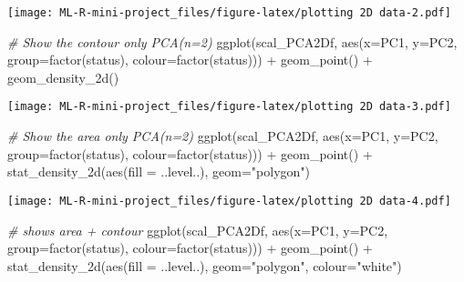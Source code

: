 \documentclass[
]{article}
\newenvironment{Shaded}{\begin{snugshade}}{\end{snugshade}}
\newcommand{\AttributeTok}[1]{\textcolor[rgb]{0.77,0.63,0.00}{#1}}
\newcommand{\CommentTok}[1]{\textcolor[rgb]{0.56,0.35,0.01}{\textit{#1}}}
\newcommand{\FunctionTok}[1]{\textcolor[rgb]{0.00,0.00,0.00}{#1}}
\newcommand{\NormalTok}[1]{#1}
\newcommand{\SpecialCharTok}[1]{\textcolor[rgb]{0.00,0.00,0.00}{#1}}
\newcommand{\StringTok}[1]{\textcolor[rgb]{0.31,0.60,0.02}{#1}}
\begin{document}
\texttt{[image: ML-R-mini-project\_files/figure-latex/plotting 2D data-2.pdf]}

\begin{Shaded}
\begin{Highlighting}[]
\CommentTok{\# Show the contour only PCA(n=2)}
\FunctionTok{ggplot}\NormalTok{(scal\_PCA2Df, }\FunctionTok{aes}\NormalTok{(}\AttributeTok{x=}\NormalTok{PC1, }\AttributeTok{y=}\NormalTok{PC2, }\AttributeTok{group=}\FunctionTok{factor}\NormalTok{(status), }\AttributeTok{colour=}\FunctionTok{factor}\NormalTok{(status))) }\SpecialCharTok{+} \FunctionTok{geom\_point}\NormalTok{() }\SpecialCharTok{+} \FunctionTok{geom\_density\_2d}\NormalTok{()}
\end{Highlighting}
\end{Shaded}

\texttt{[image: ML-R-mini-project\_files/figure-latex/plotting 2D data-3.pdf]}

\begin{Shaded}
\begin{Highlighting}[]
\CommentTok{\# Show the area only PCA(n=2)}
\FunctionTok{ggplot}\NormalTok{(scal\_PCA2Df, }\FunctionTok{aes}\NormalTok{(}\AttributeTok{x=}\NormalTok{PC1, }\AttributeTok{y=}\NormalTok{PC2, }\AttributeTok{group=}\FunctionTok{factor}\NormalTok{(status), }\AttributeTok{colour=}\FunctionTok{factor}\NormalTok{(status))) }\SpecialCharTok{+} \FunctionTok{geom\_point}\NormalTok{() }\SpecialCharTok{+} \FunctionTok{stat\_density\_2d}\NormalTok{(}\FunctionTok{aes}\NormalTok{(}\AttributeTok{fill =}\NormalTok{ ..level..), }\AttributeTok{geom=}\StringTok{"polygon"}\NormalTok{)}
\end{Highlighting}
\end{Shaded}

\texttt{[image: ML-R-mini-project\_files/figure-latex/plotting 2D data-4.pdf]}

\begin{Shaded}
\begin{Highlighting}[]
\CommentTok{\# shows area + contour}
\FunctionTok{ggplot}\NormalTok{(scal\_PCA2Df, }\FunctionTok{aes}\NormalTok{(}\AttributeTok{x=}\NormalTok{PC1, }\AttributeTok{y=}\NormalTok{PC2, }\AttributeTok{group=}\FunctionTok{factor}\NormalTok{(status), }\AttributeTok{colour=}\FunctionTok{factor}\NormalTok{(status))) }\SpecialCharTok{+} \FunctionTok{geom\_point}\NormalTok{() }\SpecialCharTok{+} \FunctionTok{stat\_density\_2d}\NormalTok{(}\FunctionTok{aes}\NormalTok{(}\AttributeTok{fill =}\NormalTok{ ..level..), }\AttributeTok{geom=}\StringTok{"polygon"}\NormalTok{, }\AttributeTok{colour=}\StringTok{"white"}\NormalTok{)}
\end{Highlighting}
\end{Shaded}
\end{document}

